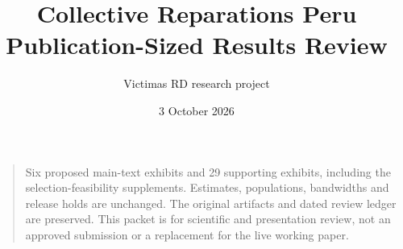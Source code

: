 \documentclass[12pt,letterpaper]{article}
\title{Collective Reparations Peru\\Publication-Sized Results Review}
\author{Victimas RD research project}
\date{3 October 2026}
\begin{document}
\maketitle
\thispagestyle{myheadings}
\begin{quote}\small
Six proposed main-text exhibits and 29 supporting exhibits, including the
selection-feasibility supplements. Estimates, populations, bandwidths and
release holds are unchanged. The original artifacts and dated review ledger
are preserved. This packet is for scientific and presentation review, not an
approved submission or a replacement for the live working paper.
\end{quote}



\end{document}

